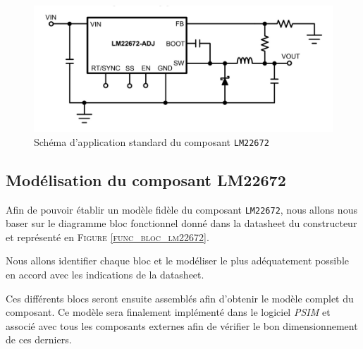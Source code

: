 			\begin{figure}[h]
				\begin{center}
					\includegraphics[scale=0.5]{../Illus/buck_gen_scheme.png}
				\end{center}
				\caption{Schéma d'application standard du composant \texttt{LM22672}}
				\label{buck_gen_scheme}
			\end{figure}
				
		\subsection{Modélisation du composant LM22672}
			
		Afin de pouvoir établir un modèle fidèle du composant 
		\texttt{LM22672}, nous allons nous baser sur le diagramme bloc
		fonctionnel donné dans la datasheet du constructeur 
		\cite{LM22672} et représenté en
		\textsc{Figure \ref{func_bloc_lm22672}}. 
		
		Nous allons identifier chaque bloc et le modéliser le plus 
		adéquatement possible en accord avec les indications de la datasheet. 
		
		Ces différents blocs seront ensuite assemblés afin d'obtenir le modèle 
		complet du composant. Ce modèle sera finalement implémenté dans le 
		logiciel \textit{PSIM} et associé avec tous les composants externes 
		afin de vérifier le bon dimensionnement de ces derniers.
								

